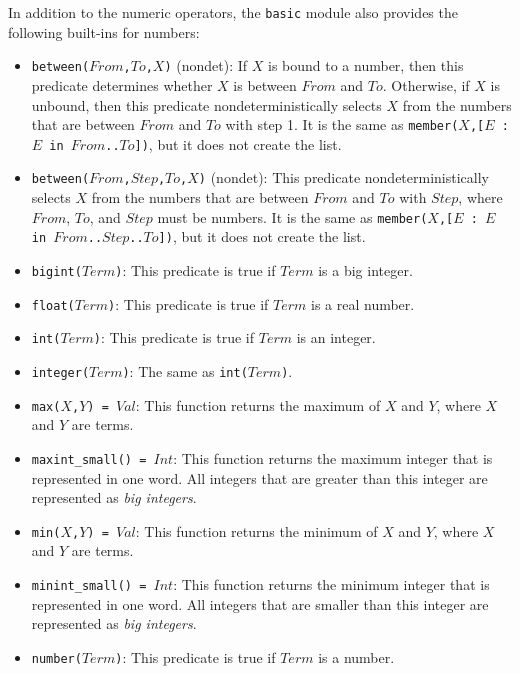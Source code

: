 In addition to the numeric operators, the \texttt{basic} module also provides the following built-ins for numbers:

\begin{itemize}
\item \texttt{between($From$,$To$,$X$)} (nondet): If $X$ is bound to a number, then this predicate determines whether $X$ is between $From$ and $To$.  Otherwise, if $X$ is unbound, then this predicate nondeterministically selects $X$ from the numbers that are between $From$ and $To$ with step 1. It is the same as \texttt{member($X$,[$E$ : $E$ in $From$..$To$])}, but it does not create the list.
\item \texttt{between($From$,$Step$,$To$,$X$)} (nondet): This predicate nondeterministically selects $X$ from the numbers that are between $From$ and $To$ with $Step$, where $From$, $To$, and $Step$ must be numbers. It is the same as \texttt{member($X$,[$E$ : $E$ in $From$..$Step$..$To$])}, but it does not create the list.
\item \texttt{bigint($Term$)}: This predicate is true if $Term$ is a big integer.
\item \texttt{float($Term$)}: This predicate is true if $Term$ is a real number.
\item \texttt{int($Term$)}: This predicate is true if $Term$ is an integer.
\item \texttt{integer($Term$)}: The same as \texttt{int($Term$)}.
\item \texttt{max($X$,$Y$) = $Val$}: This function returns the maximum of $X$ and $Y$, where $X$ and $Y$ are terms.
\item \texttt{maxint\_small() = $Int$}: This function returns the maximum integer that is represented in one word. All integers that are greater than this integer are represented as \textit{big integers}.
\item \texttt{min($X$,$Y$) = $Val$}: This function returns the minimum of $X$ and $Y$, where $X$ and $Y$ are terms.
\item \texttt{minint\_small() = $Int$}: This function returns the minimum integer that is represented in one word. All integers that are smaller than this integer are represented as \textit{big integers}.
\item \texttt{number($Term$)}: This predicate is true if $Term$ is a number.

\end{itemize}
